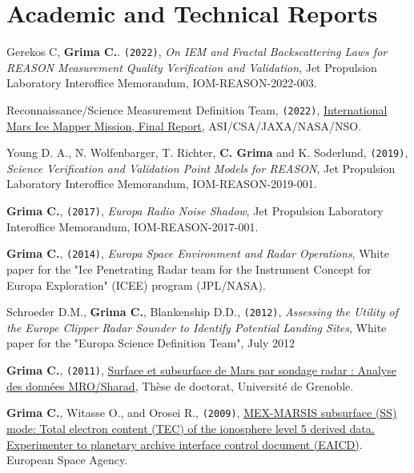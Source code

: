 \section*{Academic and Technical Reports}

\begin{etaremune}
\def\labelenumi{\arabic{enumi}.}
\item
   Gerekos C, \textbf{Grima C.}. \texttt{(2022)}, \emph{On IEM and Fractal Backscattering Laws for REASON Measurement Quality Verification and Validation}, Jet Propulsion Laboratory Interoffice Memorandum, IOM-REASON-2022-003.
\item
   Reconnaissance/Science Measurement Definition Team, \texttt{(2022)}, \href{https://science.nasa.gov/researchers/ice-mapper-measurement-definition-team}{International Mars Ice Mapper Mission, Final Report}, ASI/CSA/JAXA/NASA/NSO.
\item
   Young D. A., N. Wolfenbarger, T. Richter, \textbf{C. Grima} and K. Soderlund, \texttt{(2019)}, \emph{Science Verification and Validation Point Models for REASON}, Jet Propulsion Laboratory Interoffice Memorandum, IOM-REASON-2019-001.
\item
  \textbf{Grima C.}, \texttt{(2017)}, \emph{Europa Radio Noise Shadow},
  Jet Propulsion Laboratory Interoffice Memorandum, IOM-REASON-2017-001.
\item
  \textbf{Grima C.}, \texttt{(2014)}, \emph{Europa Space Environment and
  Radar Operations}, White paper for the "Ice Penetrating Radar team for
  the Instrument Concept for Europa Exploration" (ICEE) program
  (JPL/NASA).
\item
  Schroeder D.M., \textbf{Grima C.}, Blankenship D.D., \texttt{(2012)},
  \emph{Assessing the Utility of the Europe Clipper Radar Sounder to
  Identify Potential Landing Sites}, White paper for the "Europa Science
  Definition Team", July 2012
\item
  \textbf{Grima C.}, \texttt{(2011)},
  \href{https://www.google.com/url?sa=t\&rct=j\&q=\&esrc=s\&source=web\&cd=2\&ved=0ahUKEwiu-Jn8t7LPAhWEOSYKHQOlBeUQFggrMAE\&url=http\%3A\%2F\%2Fwww.theses.fr\%2F2011GRENU004.pdf\&usg=AFQjCNFcVxpOJiku0pWYrUsHbDrZU01hiA\&sig2=RAzQ2GJJIpOr1U3PEjRsXw}{Surface
  et subsurface de Mars par sondage radar : Analyse des données
  MRO/Sharad}, Thèse de doctorat, Université de Grenoble.
\item
  \textbf{Grima C.}, Witasse O., and Orosei R., \texttt{(2009)},
  \href{https://archives.esac.esa.int/psa/ftp/MARS-EXPRESS/MARSIS/MEX-M-MARSIS-5-DDR-SS-TEC-V1.0/DOCUMENT/MARSIS_EAICD_TEC.PDF}{MEX-MARSIS subsurface (SS) mode: Total electron content (TEC) of the ionosphere level 5 derived data. Experimenter to planetary archive interface control document (EAICD)}. European Space Agency.

\end{etaremune}
